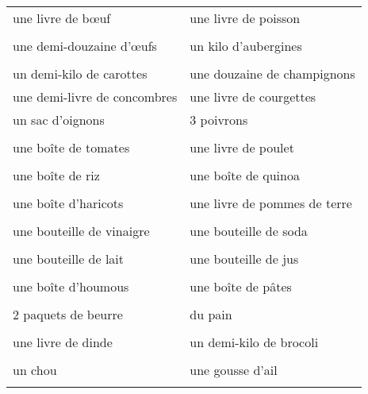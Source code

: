 \documentclass{article}
\date{}
\begin{document}
  \centering
  \noindent
  {\LARGE
    \begin{tabular}{| p{} | p{} |}
      \hline
      une livre de bœuf            & une livre de poisson \\
      & \\
      \hline
      une demi-douzaine d'œufs     & un kilo d'aubergines \\
      & \\
      \hline
      un demi-kilo de carottes     & une douzaine de champignons \\
      \hline
      une demi-livre de concombres & une livre de courgettes \\
      \hline
      un sac d'oignons             & 3 poivrons \\
      & \\
      \hline
      une boîte de tomates         & une livre de poulet \\
      & \\
      \hline
      une boîte de riz             & une boîte de quinoa \\
      & \\
      \hline
      une boîte d'haricots         & une livre de pommes de terre \\
      & \\
      \hline
      une bouteille de vinaigre    & une bouteille de soda \\
      & \\
      \hline
      une bouteille de lait        & une bouteille de jus \\
      & \\
      \hline
      une boîte d'houmous          & une boîte de pâtes \\
      & \\
      \hline
      2 paquets de beurre          & du pain \\
      & \\
      \hline
      une livre de dinde           & un demi-kilo de brocoli \\
      & \\
      \hline
      un chou                      & une gousse d'ail \\
      & \\
      \hline
    \end{tabular}
  }
\end{document}
